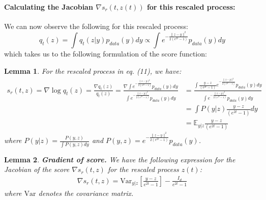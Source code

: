 \documentclass{article}
\newtheorem{lemma}{Lemma}[section]
\begin{document}
\paragraph{Calculating the Jacobian $\nabla s_r(t,z(t))$ for this rescaled process:} 

\noindent
We can now observe the following for this rescaled process:
\[
q_{t}(z) = \int q_{t}(z|y)p_{data}(y)dy \propto \int  e^{-\frac{\|z-y\|^2}{2(e^{2t}-1)}} p_{data}(y)dy  
\]
which takes us to the following formulation of the score function:
\begin{lemma}
\label{score_calc}
    For the rescaled process in eq. (11), we have:
    \begin{align*}
s_r(t,z) = \nabla \log q_{t}(z) = \frac{\nabla q_{t}(z)}{q_{t}(z)} = \frac{\nabla \int e^{-\frac{\|z-y\|^2}{2(e^{2t}-1)}} p_{data}(y) dy}{\int e^{-\frac{\|z-y\|^2}{2(e^{2t}-1)}} p_{data}(y) dy} &= \frac{ \int \frac{y-z}{(e^{2t}-1)} e^{-\frac{\|z-y\|^2}{2(e^{2t}-1)}} p_{data}(y) dy}{\int   e^{-\frac{\|z-y\|^2}{2(e^{2t}-1)}} p_{data}(y) dy}\\&= \int P(y|z) \frac{y-z}{(e^{2t}-1)} dy
\\&= \mathbb{E}_{y|z}\frac{y-z}{(e^{2t}-1)}
\end{align*}
where $P(y|z)  = \frac{P(y,z)}{\int P(y,z)dy}$ and $P(y,z)=  e^{-\frac{\|z-y\|^2}{2(e^{2t}-1)}} p_{data}(y)$. 
\end{lemma}

\begin{lemma}
\label{spatial_der_score}
    \textbf{Gradient of score.} We have the following expression for the Jacobian of the score ${\nabla s_r(t,z)}$ for the rescaled process $z(t)$:
    \begin{align*}
        {\nabla s_r(t,z)} = \mathrm{Var}_{y|z}\left[\frac{y-z}{e^{2t}-1}\right] - \frac{I_d}{e^{2t}-1}
    \end{align*}
    where $\mathrm{Var}$ denotes the covariance matrix.
\end{lemma}
\end{document}
